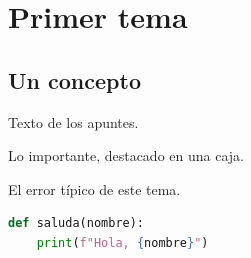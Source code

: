 \documentclass[a4paper,11pt]{article}
\begin{document}
\portada
\indice

\section{Primer tema}

\subsection{Un concepto}

Texto de los apuntes.

\begin{nota}[Definición]
    Lo importante, destacado en una caja.
\end{nota}

\begin{aviso}[Cuidado]
    El error típico de este tema.
\end{aviso}

\begin{lstlisting}[language=Python,caption={Ejemplo de código}]
def saluda(nombre):
    print(f"Hola, {nombre}")
\end{lstlisting}
\end{document}
